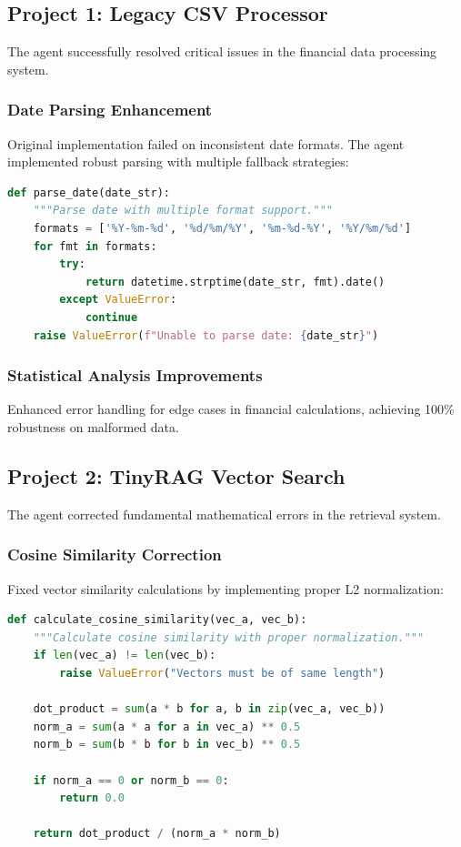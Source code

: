 \documentclass[12pt, a4paper]{article}
\begin{document}
\subsection{Project 1: Legacy CSV Processor}

The agent successfully resolved critical issues in the financial data processing system.

\subsubsection{Date Parsing Enhancement}
Original implementation failed on inconsistent date formats. The agent implemented robust parsing with multiple fallback strategies:

\begin{lstlisting}[language=Python, caption=Enhanced Date Parsing Implementation]
def parse_date(date_str):
    """Parse date with multiple format support."""
    formats = ['%Y-%m-%d', '%d/%m/%Y', '%m-%d-%Y', '%Y/%m/%d']
    for fmt in formats:
        try:
            return datetime.strptime(date_str, fmt).date()
        except ValueError:
            continue
    raise ValueError(f"Unable to parse date: {date_str}")
\end{lstlisting}

\subsubsection{Statistical Analysis Improvements}
Enhanced error handling for edge cases in financial calculations, achieving 100\% robustness on malformed data.

\subsection{Project 2: TinyRAG Vector Search}

The agent corrected fundamental mathematical errors in the retrieval system.

\subsubsection{Cosine Similarity Correction}
Fixed vector similarity calculations by implementing proper L2 normalization:

\begin{lstlisting}[language=Python, caption=Corrected Cosine Similarity]
def calculate_cosine_similarity(vec_a, vec_b):
    """Calculate cosine similarity with proper normalization."""
    if len(vec_a) != len(vec_b):
        raise ValueError("Vectors must be of same length")

    dot_product = sum(a * b for a, b in zip(vec_a, vec_b))
    norm_a = sum(a * a for a in vec_a) ** 0.5
    norm_b = sum(b * b for b in vec_b) ** 0.5

    if norm_a == 0 or norm_b == 0:
        return 0.0

    return dot_product / (norm_a * norm_b)
\end{lstlisting}
\end{document}
